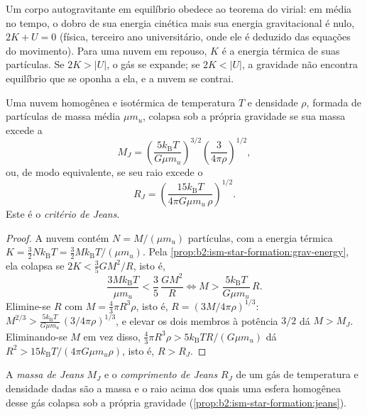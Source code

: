 Um corpo autogravitante em equilíbrio obedece ao teorema do virial: em média
no tempo, o dobro de sua energia cinética mais sua energia gravitacional é nulo,
$2K + U = 0$ (física, terceiro ano universitário, onde ele é deduzido das
equações do movimento). Para uma nuvem em repouso, $K$ é a energia térmica de suas
partículas. Se $2K > |U|$, o gás se expande; se $2K < |U|$, a gravidade não encontra
equilíbrio que se oponha a ela, e a nuvem se contrai.

\begin{proposition}\label{prop:b2:ism-star-formation:jeans}
Uma nuvem homogênea e isotérmica de temperatura $T$ e densidade $\rho$, formada de
partículas de massa média $\mu m_u$, colapsa sob a própria gravidade se sua massa
excede a \emph{}
\[
  M_J = \left(\frac{5 k_{\mathrm B} T}{G\mu m_u}\right)^{3/2}
        \left(\frac{3}{4\pi\rho}\right)^{1/2},
\]
ou, de modo equivalente, se seu raio excede o \emph{}
\[
  R_J = \left(\frac{15 k_{\mathrm B} T}{4\pi G\mu m_u\,\rho}\right)^{1/2}.
\]
Este é o \emph{critério de Jeans}.
\end{proposition}

\begin{proof}
A nuvem contém $N = M/(\mu m_u)$ partículas, com a energia térmica
$K = \tfrac32 N k_{\mathrm B}T = \tfrac32 M k_{\mathrm B}T/(\mu m_u)$. Pela
\cref{prop:b2:ism-star-formation:grav-energy}, ela colapsa se
$2K < \tfrac35 GM^2/R$, isto é,
\[
  \frac{3 M k_{\mathrm B} T}{\mu m_u} < \frac{3}{5}\,\frac{G M^2}{R}
  \iff M > \frac{5 k_{\mathrm B} T}{G \mu m_u}\, R .
\]
Elimine-se $R$ com $M = \tfrac43\pi R^3\rho$, isto é, $R = (3M/4\pi\rho)^{1/3}$:
$M^{2/3} > \frac{5 k_{\mathrm B}T}{G\mu m_u}\,(3/4\pi\rho)^{1/3}$, e elevar
os dois membros à potência $3/2$ dá $M > M_J$. Eliminando-se $M$ em vez disso,
$\tfrac43\pi R^3\rho > 5 k_{\mathrm B}T R/(G\mu m_u)$ dá $R^2 > 15
k_{\mathrm B}T/(4\pi G\mu m_u\rho)$, isto é, $R > R_J$.
\end{proof}

\begin{definition}\label{def:b2:ism-star-formation:jeans}
A \emph{massa de Jeans} $M_J$ e o \emph{comprimento
de Jeans} $R_J$ de um gás de temperatura e densidade dadas
são a massa e o raio acima dos quais uma esfera homogênea desse gás
colapsa sob a própria gravidade (\cref{prop:b2:ism-star-formation:jeans}).
\end{definition}

